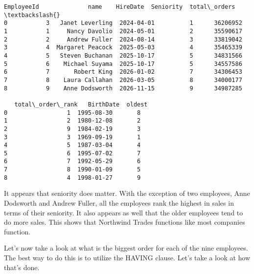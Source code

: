 \documentclass[11pt]{article}
\makeatletter
\newcommand{\boxspacing}{\kern\kvtcb@left@rule\kern\kvtcb@boxsep}
\newcommand{\prompt}[4]{
        {\ttfamily\llap{{\color{#2}[#3]:\hspace{3pt}#4}}\vspace{-\baselineskip}}
    }
\makeatother
\begin{document}
            \begin{tcolorbox}[breakable, size=fbox, boxrule=.5pt, pad at break*=1mm, opacityfill=0]
\prompt{Out}{outcolor}{50}{\boxspacing}
\begin{Verbatim}[commandchars=\\\{\}]
   EmployeeId              name    HireDate  Seniority  total\_orders  \textbackslash{}
0           3   Janet Leverling  2024-04-01          1      36206952
1           1     Nancy Davolio  2024-05-01          2      35590617
2           2     Andrew Fuller  2024-08-14          3      33819042
3           4  Margaret Peacock  2025-05-03          4      35465339
4           5   Steven Buchanan  2025-10-17          5      34831566
5           6    Michael Suyama  2025-10-17          5      34557586
6           7       Robert King  2026-01-02          7      34306453
7           8    Laura Callahan  2026-03-05          8      34000177
8           9    Anne Dodsworth  2026-11-15          9      34987285

   total\_order\_rank   BirthDate  oldest
0                 1  1995-08-30       8
1                 2  1980-12-08       2
2                 9  1984-02-19       3
3                 3  1969-09-19       1
4                 5  1987-03-04       4
5                 6  1995-07-02       7
6                 7  1992-05-29       6
7                 8  1990-01-09       5
8                 4  1998-01-27       9
\end{Verbatim}
\end{tcolorbox}
        
    It appears that seniority does matter. With the exception of two
employees, Anne Dodsworth and Andrew Fuller, all the employees rank the
highest in sales in terms of their seniority. It also appears as well
that the older employees tend to do more sales. This shows that
Northwind Trades functions like most companies function.

Let's now take a look at what is the biggest order for each of the nine
employees. The best way to do this is to utilize the HAVING clause.
Let's take a look at how that's done.
\end{document}
